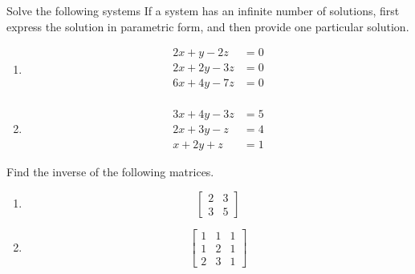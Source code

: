 \begin{puzzle}{Solve the following systems}
    If a system has an infinite number of solutions, first express the solution in parametric form, and then provide one particular solution.
    \begin{enumerate}
        \item
              \[\begin{aligned}
                      2x + y - 2z  & = 0 \\
                      2x + 2y - 3z & = 0 \\
                      6x + 4y - 7z & = 0 \\
                  \end{aligned}\]

        \item
              \[\begin{aligned}
                      3x + 4y - 3z & = 5 \\
                      2x + 3y - z  & = 4 \\
                      x + 2y + z   & = 1
                  \end{aligned}\]
    \end{enumerate}
\end{puzzle}

\begin{puzzle} Find the inverse of the following matrices.
    \begin{enumerate}
        \item
              \[\begin{bmatrix}
                      2 & 3 \\
                      3 & 5
                  \end{bmatrix}\]

        \item
              \[\begin{bmatrix}
                      1 & 1 & 1 \\
                      1 & 2 & 1 \\
                      2 & 3 & 1
                  \end{bmatrix}\]
    \end{enumerate}
\end{puzzle}

